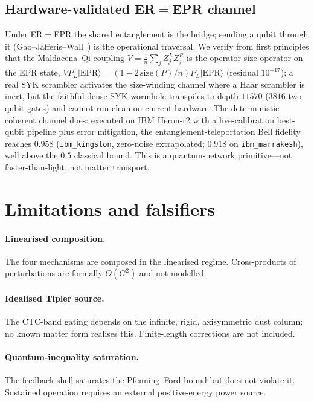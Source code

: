 \documentclass[11pt,a4paper]{article}
\begin{document}
\subsection{Hardware-validated ER$=$EPR channel}
Under ER$=$EPR the shared entanglement is the bridge; sending a qubit through it (Gao--Jafferis--Wall~\cite{GaoJafferisWall2017}) is the operational traversal. We verify from first principles that the Maldacena--Qi coupling $V=\tfrac1n\sum_jZ_j^LZ_j^R$ is the operator-size operator on the EPR state, $V P_L|\mathrm{EPR}\rangle=(1-2\,\mathrm{size}(P)/n)P_L|\mathrm{EPR}\rangle$ (residual $10^{-17}$); a real SYK scrambler activates the size-winding channel where a Haar scrambler is inert, but the faithful dense-SYK wormhole transpiles to depth $11570$ ($3816$ two-qubit gates) and cannot run clean on current hardware. The deterministic coherent channel does: executed on IBM Heron-r2 with a live-calibration best-qubit pipeline plus error mitigation, the entanglement-teleportation Bell fidelity reaches $0.958$ (\texttt{ibm\_kingston}, zero-noise extrapolated; $0.918$ on \texttt{ibm\_marrakesh}), well above the $0.5$ classical bound. This is a quantum-network primitive---not faster-than-light, not matter transport.

\section{Limitations and falsifiers}\label{sec:limits}

\paragraph{Linearised composition.} The four mechanisms are composed in the linearised regime. Cross-products of perturbations are formally $O(G^{2})$ and not modelled.

\paragraph{Idealised Tipler source.} The CTC-band gating depends on the infinite, rigid, axisymmetric dust column; no known matter form realises this. Finite-length corrections are not included.

\paragraph{Quantum-inequality saturation.} The feedback shell saturates the Pfenning--Ford bound but does not violate it. Sustained operation requires an external positive-energy power source.
\end{document}
